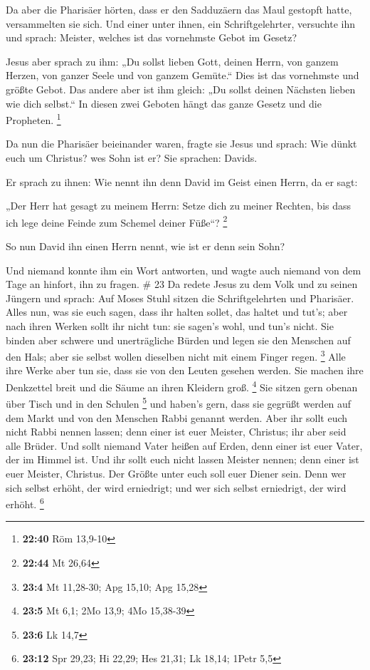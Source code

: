  Da aber die Pharisäer hörten, dass er den Sadduzäern das
Maul gestopft hatte, versammelten sie sich.  Und einer
unter ihnen, ein Schriftgelehrter, versuchte ihn und sprach:
 Meister, welches ist das vornehmste Gebot im Gesetz?

 Jesus aber sprach zu ihm: „Du sollst lieben Gott, deinen
Herrn, von ganzem Herzen, von ganzer Seele und von ganzem Gemüte.``
 Dies ist das vornehmste und größte Gebot. 
Das andere aber ist ihm gleich: „Du sollst deinen Nächsten lieben wie
dich selbst.``  In diesen zwei Geboten hängt das ganze
Gesetz und die Propheten. \footnote{\textbf{22:40} Röm 13,9-10}

 Da nun die Pharisäer beieinander waren, fragte sie Jesus
 und sprach: Wie dünkt euch um Christus? wes Sohn ist er?
Sie sprachen: Davids.

 Er sprach zu ihnen: Wie nennt ihn denn David im Geist
einen Herrn, da er sagt:

 „Der Herr hat gesagt zu meinem Herrn: Setze dich zu meiner
Rechten, bis dass ich lege deine Feinde zum Schemel deiner Füße``?
\footnote{\textbf{22:44} Mt 26,64}

 So nun David ihn einen Herrn nennt, wie ist er denn sein
Sohn?

 Und niemand konnte ihm ein Wort antworten, und wagte auch
niemand von dem Tage an hinfort, ihn zu fragen. \# 23  Da
redete Jesus zu dem Volk und zu seinen Jüngern  und sprach:
Auf Moses Stuhl sitzen die Schriftgelehrten und Pharisäer. 
Alles nun, was sie euch sagen, dass ihr halten sollet, das haltet und
tut's; aber nach ihren Werken sollt ihr nicht tun: sie sagen's wohl, und
tun's nicht.  Sie binden aber schwere und unerträgliche
Bürden und legen sie den Menschen auf den Hals; aber sie selbst wollen
dieselben nicht mit einem Finger regen. \footnote{\textbf{23:4} Mt
  11,28-30; Apg 15,10; Apg 15,28}  Alle ihre Werke aber tun
sie, dass sie von den Leuten gesehen werden. Sie machen ihre Denkzettel
breit und die Säume an ihren Kleidern groß. \footnote{\textbf{23:5} Mt
  6,1; 2Mo 13,9; 4Mo 15,38-39}  Sie sitzen gern obenan über
Tisch und in den Schulen \footnote{\textbf{23:6} Lk 14,7} 
und haben's gern, dass sie gegrüßt werden auf dem Markt und von den
Menschen Rabbi genannt werden.  Aber ihr sollt euch nicht
Rabbi nennen lassen; denn einer ist euer Meister, Christus; ihr aber
seid alle Brüder.  Und sollt niemand Vater heißen auf Erden,
denn einer ist euer Vater, der im Himmel ist.  Und ihr
sollt euch nicht lassen Meister nennen; denn einer ist euer Meister,
Christus.  Der Größte unter euch soll euer Diener sein.
 Denn wer sich selbst erhöht, der wird erniedrigt; und wer
sich selbst erniedrigt, der wird erhöht. \footnote{\textbf{23:12} Spr
  29,23; Hi 22,29; Hes 21,31; Lk 18,14; 1Petr 5,5}

